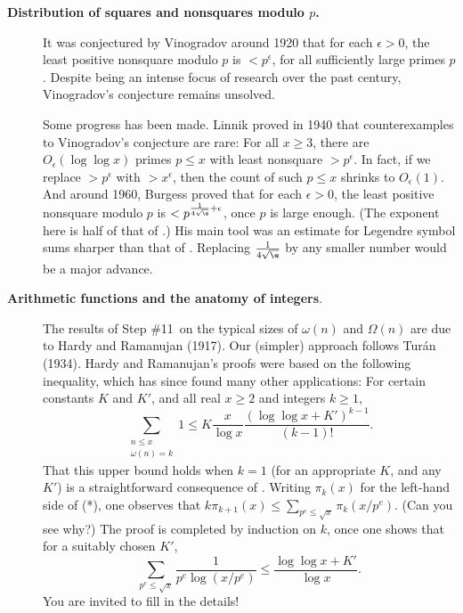 \begin{description}


\item[\textbf{Distribution of squares and nonsquares modulo $p$.}] It was conjectured by  Vinogradov around 1920 that for each $\epsilon > 0$, the least positive nonsquare modulo $p$ is $< p^{\epsilon}$, for all sufficiently large primes $p$. Despite being an intense focus of research over the past century, Vinogradov's conjecture remains unsolved.


\smallskip Some progress has been made.
Linnik proved in 1940 that counterexamples to Vinogradov's conjecture are rare: For all $x\ge 3$, there are $O_{\epsilon}(\log\log{x})$ primes $p\le x$ with least nonsquare $> p^{\epsilon}$. In fact, if we replace $> p^{\epsilon}$ with $> x^{\epsilon}$, then the count of such $p\le x$ shrinks to $O_{\epsilon}(1)$. And around 1960, Burgess proved that for each $\epsilon > 0$, the least positive nonsquare modulo $p$ is $<p^{\frac{1}{4\sqrt{\e}}+\epsilon}$, once $p$ is large enough. (The exponent here is half of that of .) His main tool was an estimate for Legendre symbol sums sharper than that of  . Replacing $\frac{1}{4\sqrt{\e}}$ by any smaller number would be a major advance.
\bigskip
\item[\textbf{Arithmetic functions and the anatomy of integers}.]  The results of Step \#11~on the typical sizes of $\omega(n)$ and $\Omega(n)$ are due to Hardy and Ramanujan (1917). Our (simpler) approach follows Tur\'an (1934). Hardy and Ramanujan's proofs were based on the following inequality, which has since found many other applications: For certain constants $K$ and $K'$, and all real $x\ge 2$ and integers $k\ge 1$,
\begin{equation}\tag{*} \sum_{\substack{n \le x \\ \omega(n)=k}} 1 \le K\frac{x}{\log{x}} \frac{(\log\log{x}+K')^{k-1}}{(k-1)!}.\end{equation}
That this upper bound holds when $k=1$ (for an appropriate $K$, and any $K'$)  is a straightforward consequence of . Writing $\pi_k(x)$ for the left-hand side of (*), one observes that $k \pi_{k+1}(x) \le \sum_{p^e \le \sqrt{x}} \pi_k(x/p^{e})$. (Can you see why?) The proof is completed by induction on $k$, once one shows that
for a suitably chosen $K'$,
\[ \sum_{p^e \le \sqrt{x}} \frac{1}{p^e\log(x/p^e)} \le \frac{\log\log{x}+K'}{\log{x}}.\]
You are invited to fill in the details!  \smallskip


\end{description}

